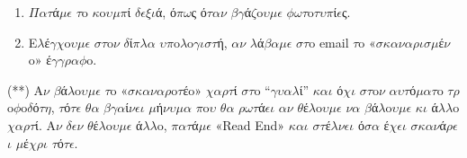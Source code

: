 \documentclass[a4paper,11pt,english]{sphinxmanual}
\begin{document}
\begin{enumerate}
\item {} 
\(\Pi\)\(\alpha\)\(\tau\)ά\(\mu\)\(\epsilon\) \(\tau\)o \(\kappa\)o\(\upsilon\)\(\mu\)\(\pi\)ί \(\delta\)\(\epsilon\)\(\xi\)\(\iota\)ά, ό\(\pi\)\(\omega\)ς ό\(\tau\)\(\alpha\)\(\nu\) \(\beta\)\(\gamma\)ά\(\zeta\)o\(\upsilon\)\(\mu\)\(\epsilon\) \(\phi\)\(\omega\)\(\tau\)o\(\tau\)\(\upsilon\)\(\pi\)ί\(\epsilon\)ς.

\item {} 
E\(\lambda\)έ\(\gamma\)\(\chi\)o\(\upsilon\)\(\mu\)\(\epsilon\) \(\sigma\)\(\tau\)o\(\nu\) \(\delta\)ί\(\pi\)\(\lambda\)\(\alpha\) \(\upsilon\)\(\pi\)o\(\lambda\)o\(\gamma\)\(\iota\)\(\sigma\)\(\tau\)ή, \(\alpha\)\(\nu\) \(\lambda\)ά\(\beta\)\(\alpha\)\(\mu\)\(\epsilon\) \(\sigma\)\(\tau\)o email \(\tau\)o «\(\sigma\)\(\kappa\)\(\alpha\)\(\nu\)\(\alpha\)\(\rho\)\(\iota\)\(\sigma\)\(\mu\)έ\(\nu\)o» έ\(\gamma\)\(\gamma\)\(\rho\)\(\alpha\)\(\phi\)o.

\end{enumerate}

(**) A\(\nu\) \(\beta\)ά\(\lambda\)o\(\upsilon\)\(\mu\)\(\epsilon\) \(\tau\)o «\(\sigma\)\(\kappa\)\(\alpha\)\(\nu\)\(\alpha\)\(\rho\)o\(\tau\)έo» \(\chi\)\(\alpha\)\(\rho\)\(\tau\)ί \(\sigma\)\(\tau\)o “\(\gamma\)\(\upsilon\)\(\alpha\)\(\lambda\)ί” \(\kappa\)\(\alpha\)\(\iota\) ό\(\chi\)\(\iota\) \(\sigma\)\(\tau\)o\(\nu\) \(\alpha\)\(\upsilon\)\(\tau\)ό\(\mu\)\(\alpha\)\(\tau\)o
\(\tau\)\(\rho\)o\(\phi\)o\(\delta\)ό\(\tau\)\(\eta\), \(\tau\)ό\(\tau\)\(\epsilon\) \(\theta\)\(\alpha\) \(\beta\)\(\gamma\)\(\alpha\)ί\(\nu\)\(\epsilon\)\(\iota\) \(\mu\)ή\(\nu\)\(\upsilon\)\(\mu\)\(\alpha\) \(\pi\)o\(\upsilon\) \(\theta\)\(\alpha\) \(\rho\)\(\omega\)\(\tau\)ά\(\epsilon\)\(\iota\) \(\alpha\)\(\nu\) \(\theta\)έ\(\lambda\)o\(\upsilon\)\(\mu\)\(\epsilon\) \(\nu\)\(\alpha\) \(\beta\)ά\(\lambda\)o\(\upsilon\)\(\mu\)\(\epsilon\) \(\kappa\)\(\iota\)
ά\(\lambda\)\(\lambda\)o \(\chi\)\(\alpha\)\(\rho\)\(\tau\)ί. A\(\nu\) \(\delta\)\(\epsilon\)\(\nu\) \(\theta\)έ\(\lambda\)o\(\upsilon\)\(\mu\)\(\epsilon\) ά\(\lambda\)\(\lambda\)o, \(\pi\)\(\alpha\)\(\tau\)ά\(\mu\)\(\epsilon\) «Read End» \(\kappa\)\(\alpha\)\(\iota\) \(\sigma\)\(\tau\)έ\(\lambda\)\(\nu\)\(\epsilon\)\(\iota\) ό\(\sigma\)\(\alpha\) έ\(\chi\)\(\epsilon\)\(\iota\)
\(\sigma\)\(\kappa\)\(\alpha\)\(\nu\)ά\(\rho\)\(\epsilon\)\(\iota\) \(\mu\)έ\(\chi\)\(\rho\)\(\iota\) \(\tau\)ό\(\tau\)\(\epsilon\).
\end{document}
